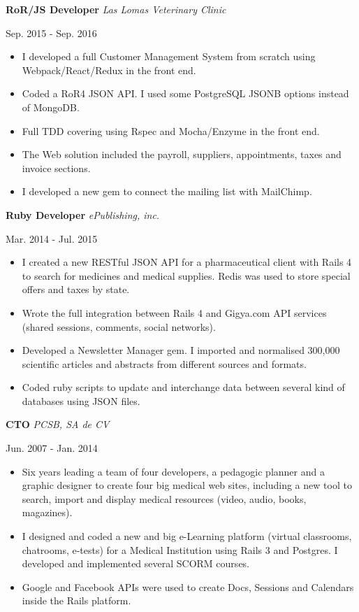 \documentclass[]{k-cv}
\begin{document}
   \textbf{RoR/JS Developer} \textit{Las Lomas Veterinary Clinic}
   {\color{gray} {\small Sep. 2015 - Sep. 2016 \par}}
   \begin{itemize}
     \item I developed a full Customer Management System from scratch using Webpack/React/Redux in the front end.
     \item Coded a RoR4 JSON API. I used some PostgreSQL JSONB options instead of MongoDB.
     \item Full TDD covering using Rspec and Mocha/Enzyme in the front end.
     \item The Web solution included the payroll, suppliers, appointments, taxes and invoice sections.
     \item I developed a new gem to connect the mailing list with MailChimp.
   \end{itemize}

  \textbf{Ruby Developer}  \textit{ePublishing, inc.}
  {\color{gray} {\small Mar. 2014 - Jul. 2015 \par}}
   \begin{itemize}
     \item I created a new RESTful JSON API for a pharmaceutical client with Rails 4 to
           search for medicines and medical supplies. Redis was used to store
           special offers and taxes by state.
     \item Wrote the full integration between Rails 4 and Gigya.com API services (shared
           sessions, comments, social networks).
     \item Developed a Newsletter Manager gem. I imported and normalised 300,000
           scientific articles and abstracts from different sources and formats.
     \item Coded ruby scripts to update and interchange data between several kind of
           databases using JSON files.
  \end{itemize}

   \textbf{CTO} \textit{PCSB, SA de CV}
   {\color{gray} {\small Jun. 2007 - Jan. 2014 \par}}
   \begin{itemize}
     \item Six years leading a team of four developers, a pedagogic planner and a
           graphic designer to create four big medical web sites, including a new tool to
           search, import and display medical resources (video, audio, books, magazines).
     \item I designed and coded a new and big e-Learning platform (virtual classrooms,
           chatrooms, e-tests) for a Medical Institution using Rails 3 and Postgres. I
           developed and implemented several SCORM courses.
     \item Google and Facebook APIs were used to create Docs, Sessions and Calendars
           inside the Rails platform.
   \end{itemize}
\end{document}
